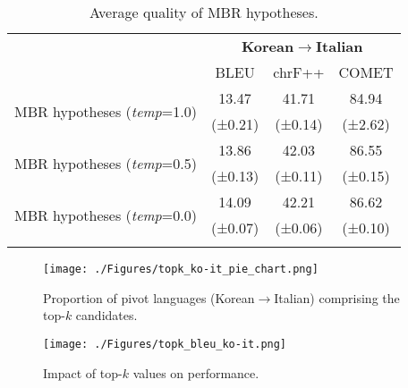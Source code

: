 \begin{table}[h]
\centering
\small
\renewcommand{\arraystretch}{1.1}
\begin{adjustbox}{width=\columnwidth, center}
\begin{tabular}{lccc}
\Xhline{3\arrayrulewidth}

\multirow{2}{*}{\textbf{Method}}  & \multicolumn{3}{c}{\textbf{Korean$\rightarrow$Italian}}\\ \cline{2-4}
 & BLEU & chrF++ & COMET \\ \hline\hline 
                  
 \multirow{2}{*}{MBR hypotheses (\textit{temp}=1.0)}   & 13.47&	41.71 &84.94\\
  & (±0.21) &  (±0.14)	 & (±2.62) \\
 \multirow{2}{*}{MBR hypotheses (\textit{temp}=0.5)} & 13.86 &	 42.03&	86.55  \\  
  & (±0.13) &   (±0.11)& (±0.15)  \\
 \multirow{2}{*}{MBR hypotheses (\textit{temp}=0.0)} & 14.09 & 42.21 & 86.62 \\
  &   (±0.07) &  (±0.06)	   & (±0.10)   \\

\Xhline{3\arrayrulewidth}
\end{tabular}
\end{adjustbox}
\caption{Average quality of MBR hypotheses.}
\label{tab:Average quality of MBR hypotheses}
\end{table}


\begin{figure*}[t]
    \centering
    \begin{minipage}[b]{0.71\textwidth}
        \centering
        \texttt{[image: ./Figures/topk\_ko-it\_pie\_chart.png]}
        \caption{Proportion of pivot languages (Korean$\rightarrow$Italian) comprising the top-$\textit{k}$ candidates.}        
        \label{fig:top-k candidates}
    \end{minipage}
    \hfill
    \begin{minipage}[b]{0.23\textwidth}
        \centering
        \texttt{[image: ./Figures/topk\_bleu\_ko-it.png]}
        \caption{Impact of top-$\textit{k}$ values on performance.}
        \label{fig:top-k bleu score}
    \end{minipage}
\end{figure*}


